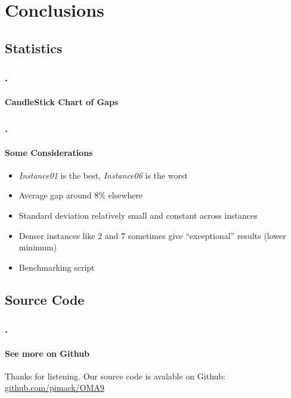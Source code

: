 \documentclass{beamer}
\begin{document}
\section{Conclusions}

\subsection{Statistics}

\begin{frame}
\frametitle{\thesection.\thesubsection \ \insertsubsection}
\framesubtitle{CandleStick Chart of Gaps}
\end{frame}

\begin{frame}
\frametitle{\thesection.\thesubsection \ \insertsubsection}
\framesubtitle{Some Considerations}
\begin{itemize}
	\item \textit{Instance01} is the \alert{best}, \textit{Instance06} is the \alert{worst}
	\item Average gap around 8\% elsewhere
	\item Standard deviation relatively small and constant across instances
	\item Denser instances like 2 and 7 sometimes give ``exceptional'' results (lower minimum)
	\item Benchmarking script
\end{itemize}
\end{frame}

\subsection{Source Code}

\begin{frame}
\frametitle{\thesection.\thesubsection \ \insertsubsection}
\framesubtitle{See more on Github}
Thanks for listening.
\vfill
Our source code is avalable on Github: \href{https://github.com/pimack/OMA9}{\underline{github.com/pimack/OMA9}}
\end{frame}
\end{document}
